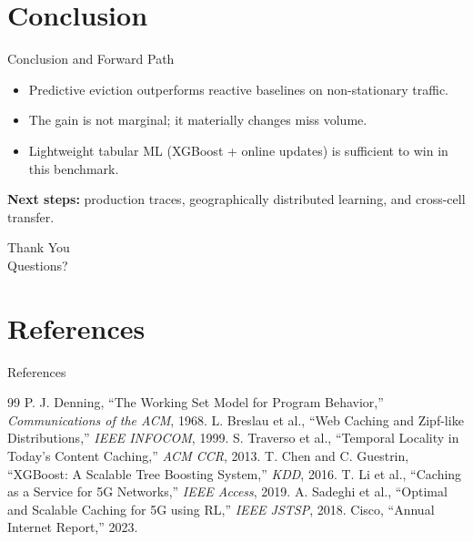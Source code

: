 \documentclass[11pt,aspectratio=169]{beamer}
\begin{document}
\section{Conclusion}
\begin{frame}{Conclusion and Forward Path}
  \begin{itemize}
    \item Predictive eviction outperforms reactive baselines on non-stationary traffic.
    \item The gain is not marginal; it materially changes miss volume.
    \item Lightweight tabular ML (XGBoost + online updates) is sufficient to win in this benchmark.
  \end{itemize}
  \vspace{0.2cm}
  \textbf{Next steps:}
  production traces, geographically distributed learning, and cross-cell transfer.
\end{frame}

\begin{frame}
  \centering
  \Huge Thank You\\[0.4cm]
  \Large Questions?
\end{frame}

\section{References}
\begin{frame}[allowframebreaks]{References}
  \footnotesize
  \begin{thebibliography}{99}
     P. J. Denning, ``The Working Set Model for Program Behavior,'' \textit{Communications of the ACM}, 1968.
     L. Breslau et al., ``Web Caching and Zipf-like Distributions,'' \textit{IEEE INFOCOM}, 1999.
     S. Traverso et al., ``Temporal Locality in Today's Content Caching,'' \textit{ACM CCR}, 2013.
     T. Chen and C. Guestrin, ``XGBoost: A Scalable Tree Boosting System,'' \textit{KDD}, 2016.
     T. Li et al., ``Caching as a Service for 5G Networks,'' \textit{IEEE Access}, 2019.
     A. Sadeghi et al., ``Optimal and Scalable Caching for 5G using RL,'' \textit{IEEE JSTSP}, 2018.
     Cisco, ``Annual Internet Report,'' 2023.
  \end{thebibliography}
\end{frame}
\end{document}

